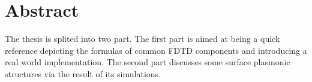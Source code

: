 \cleardoublepage
\chapter{Abstract}
The thesis is splited into two part. The first part is aimed at being a quick reference depicting the formulas of common
FDTD components and introducing a real world implementation. The second part discusses some surface plasmonic structures
via the result of its simulations.
